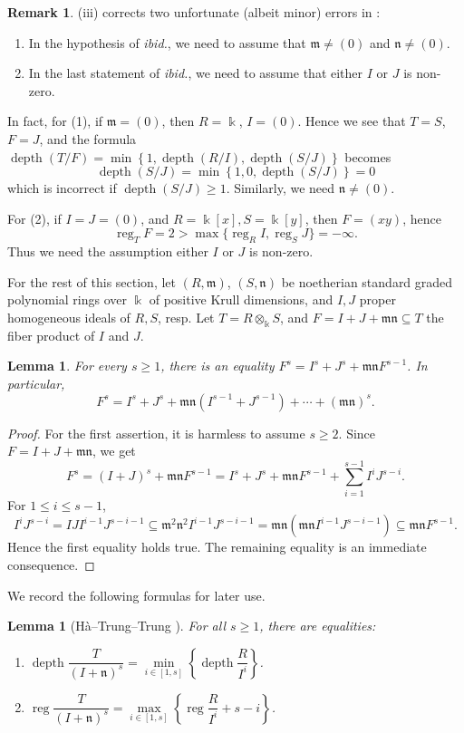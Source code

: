 \documentclass{amsart}
\DeclareMathOperator{\depth}{depth}
\DeclareMathOperator{\reg}{reg}
\newcommand{\mm}{\mathfrak{m}}
\newcommand{\nn}{\mathfrak{n}}
\theoremstyle{plain}
\newtheorem{lem}[thm]{Lemma}
\theoremstyle{definition}
\newtheorem{rem}[thm]{Remark}
\numberwithin{equation}{section}
\newcommand{\kk}{\Bbbk}
\begin{document}
\begin{rem}
(iii) corrects two unfortunate (albeit minor) errors in \cite[Proposition 3.3]{NgV19b}: 
\begin{enumerate}
\item In the hypothesis of \emph{ibid.}, we need to assume that $\mm\neq (0)$ and $\nn\neq (0)$.
\item In the last statement of \emph{ibid.}, we need to assume that either $I$ or $J$ is non-zero.
\end{enumerate}
In fact, for (1), if $\mm=(0)$, then $R=\kk$, $I=(0)$. Hence we see that $T=S$, $F=J$, and the formula $\depth(T/F) = \min\left\{1, \depth(R/I), \depth(S/J)\right\}$
becomes
\[
\depth(S/J)=\min\left\{1, 0, \depth(S/J)\right\}=0
\]
which is incorrect if $\depth(S/J)\ge 1$. Similarly, we need $\nn\neq (0)$.

For (2), if $I=J=(0)$, and $R=\kk[x], S=\kk[y]$, then $F=(xy)$, hence
\[
\reg_T F=2 > \max\{\reg_R I, \reg_S J\}=-\infty.
\]
Thus we need the assumption  either $I$ or $J$ is non-zero.
\end{rem}

For the rest of this section, let $(R,\mm)$, $(S,\nn)$ be noetherian standard graded polynomial rings over $\kk$ of positive Krull dimensions, and $I, J$ proper homogeneous ideals of $R, S$, resp. Let $T=R\otimes_\kk S$, and $F=I+J+\mm\nn \subseteq T$ the fiber product of $I$ and $J$.  


\begin{lem}
\label{lem_decompose_ordinarypow}
For every $s\ge 1$, there is an equality $F^s=I^s+J^s+\mm \nn F^{s-1}$. In particular,
\[
F^s=I^s+J^s+\mm\nn(I^{s-1}+J^{s-1})+\cdots+(\mm\nn)^s.
\]
\end{lem}
\begin{proof}
For the first assertion, it is harmless to assume $s\ge 2$. Since $F=I+J+\mm \nn$, we get
\[
F^s=(I+J)^s+\mm \nn F^{s-1}= I^s+J^s+\mm \nn F^{s-1}+\sum_{i=1}^{s-1}I^iJ^{s-i}.
\]
For $1\le i\le s-1$,
\[
I^iJ^{s-i}=IJ I^{i-1}J^{s-i-1}\subseteq \mm^2 \nn^2 I^{i-1}J^{s-i-1}=\mm\nn(\mm\nn I^{i-1}J^{s-i-1})\subseteq \mm \nn F^{s-1}.
\]
Hence the first equality holds true. The remaining equality is an immediate consequence.
\end{proof}


We record the following formulas for later use.
\begin{lem}[H\`a--Trung--Trung {\cite[Proposition 2.9]{HTT16}}]
\label{lem_depthregIplusn_ordinary}
For all $s\ge 1$, there are equalities:
\begin{enumerate}[\quad \rm (i)]
 \item $\depth \dfrac{T}{(I+\nn)^s}=\min\limits_{i\in [1,s]} \left\{ \depth \dfrac{R}{I^i} \right\}$.
 \item $\reg \dfrac{T}{(I+\nn)^s}=\max \limits_{i\in [1,s]} \left\{ \reg \dfrac{R}{I^i}+s-i \right\}$.
\end{enumerate}
\end{lem}
\end{document}
